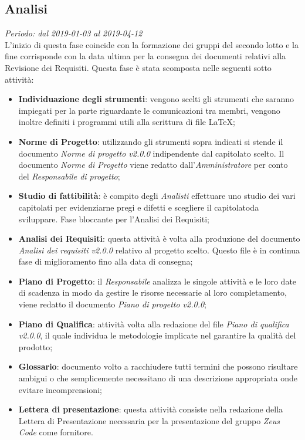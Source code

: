 \subsection{Analisi}
\textit{Periodo: dal 2019-01-03 al 2019-04-12}\\
L'inizio di questa fase coincide con la formazione dei gruppi del secondo lotto e la fine corrisponde con la data ultima per la consegna dei documenti relativi alla Revisione dei Requisiti.
Questa fase è stata scomposta nelle seguenti sotto attività:
\begin{itemize}
	\item \textbf{Individuazione degli strumenti}: vengono scelti gli strumenti che saranno impiegati per la parte riguardante le comunicazioni tra membri, vengono inoltre definiti i programmi utili alla scrittura di file \LaTeX; 
	\item \textbf{Norme di Progetto}: utilizzando gli strumenti sopra indicati si stende il documento \textit{Norme di progetto v2.0.0} indipendente dal capitolato scelto. Il documento \textit{Norme di Progetto} viene redatto dall'\textit{Amministratore} per conto del \textit{Responsabile di progetto};
	\item \textbf{Studio di fattibilità}: è compito degli \textit{Analisti} effettuare uno studio dei vari capitolati per evidenziarne pregi e difetti e scegliere il capitolato\glosp da sviluppare. Fase bloccante per l'Analisi dei Requisiti;
	\item \textbf{Analisi dei Requisiti}: questa attività è volta alla produzione del documento \textit{Analisi dei requisiti v2.0.0} relativo al progetto scelto. Questo file è in continua fase di miglioramento fino alla data di consegna;
	\item \textbf{Piano di Progetto}: il \textit{Responsabile} analizza le singole attività e le loro date di scadenza in modo da gestire le risorse necessarie al loro completamento, viene redatto il documento \textit{Piano di progetto v2.0.0};
	\item \textbf{Piano di Qualifica}: attività volta alla redazione del file \textit{Piano di qualifica v2.0.0}, il quale individua le metodologie implicate nel garantire la qualità del prodotto; 
	\item \textbf{Glossario}: documento volto a racchiudere tutti termini che possono risultare ambigui o che semplicemente necessitano di una descrizione appropriata onde evitare incomprensioni;
	\item \textbf{Lettera di presentazione}: questa attività consiste nella redazione della Lettera di Presentazione necessaria  per  la  presentazione del gruppo \textit{Zeus Code} come fornitore.
\end{itemize}

